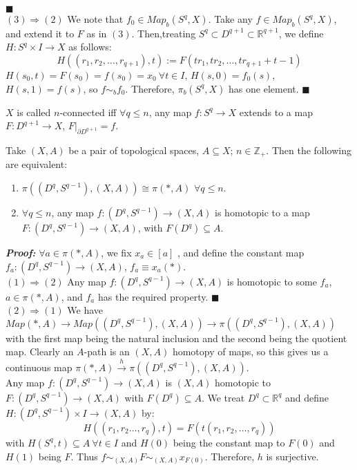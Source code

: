 \documentclass[11pt]{article}
\numberwithin{equation}{section}
\begin{document}
$\blacksquare$ \\[10pt]
$\mathit{(3)\Rightarrow (2)}$ We note that $f_0\in Map_b(S^q,X)$. Take any $f\in Map_b(S^q,X)$, and extend it to $F$ as in $(3)$. Then,treating $S^q\subset D^{q+1}\subset\mathbb{R}^{q+1}$, we define $H:S^q\times I\rightarrow X$ as follows: $$H((r_1,r_2,\dots,r_{q+1}),t):=F(tr_1,tr_2,\dots, tr_{q+1}+t-1)$$ $H(s_0,t)=F(s_0)=f(s_0)=x_0\ \forall t\in I$, $H(s,0)=f_0(s)$, $H(s,1)=f(s)$, so $f\sim_b f_0$. Therefore, $\pi_b(S^q,X)$ has one element. $\blacksquare$
\begin{defn}
     $X$ is called $n$-connected iff $\forall q\leqslant n$, any map $f:S^q\rightarrow X$ extends to a map $F:D^{q+1}\rightarrow X$, $F|_{\partial D^{q+1}}=f$.
\end{defn}
\begin{clm}
     Take $(X,A)$ be a pair of topological spaces, $A\subseteq X$; $n\in \mathbb{Z}_+$. Then the following are equivalent:
     \begin{enumerate}
          \item $\pi((D^q,S^{q-1}),(X,A))\cong\pi(*,A)$  $\forall q\leqslant n$.
          \item $\forall q\leqslant n$, any map $f:(D^q,S^{q-1})\rightarrow (X,A)$ is homotopic to a map $F:(D^q,S^{q-1})\rightarrow (X,A)$, with $F(D^q)\subseteq A$. 
     \end{enumerate}
\end{clm} 
\textbf{\emph{Proof:}} $\forall a\in \pi(*,A)$, we fix $x_a\in [a]$ , and define the constant map $f_a:(D^q,S^{q-1})\rightarrow (X,A)$, $f_a\equiv x_a(*)$. \\[10pt]
$\mathit{(1)\Rightarrow(2)}$ Any map $f:(D^q,S^{q-1})\rightarrow (X,A)$ is homotopic to some $f_a$, $a\in\pi(*,A)$, and $f_a$ has the required property. $\blacksquare$ \\[10pt] 
$\mathit{(2)\Rightarrow(1)}$ We have $Map(*,A)\rightarrow Map((D^q,S^{q-1}),(X,A))\rightarrow\pi((D^q,S^{q-1}),(X,A))$ with the first map being the natural inclusion and the second being the quotient map. Clearly an $A$-path is an $(X,A)$ homotopy of maps, so this gives us a continuous map $\pi(*,A)\xrightarrow{h}\pi((D^q,S^{q-1}),(X,A))$. \\
Any map $f:(D^q,S^{q-1})\rightarrow (X,A)$ is $(X,A)$ homotopic to $F:(D^q,S^{q-1})\rightarrow (X,A)$ with $F(D^q)\subseteq A$. We treat $D^q\subset\mathbb{R}^q$ and define $H:(D^q,S^{q-1})\times I\rightarrow (X,A)$ by: $$H((r_1,r_2\dots,r_q),t)=F(t(r_1,r_2,\dots,r_q))$$ with $H(S^q,t)\subseteq A\ \forall t\in I$ and $H(0)$ being the constant map to $F(0)$ and $H(1)$ being $F$. Thus $f\sim_{(X,A)}F\sim_{(X,A)}x_{F(0)}$. Therefore, $h$ is surjective. \\ 
\end{document}
